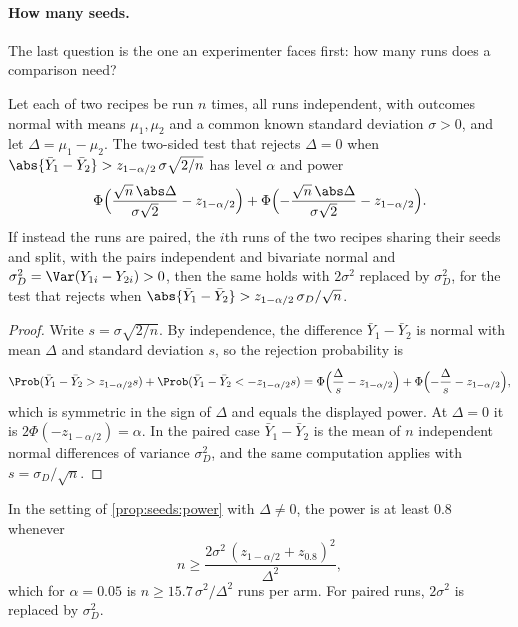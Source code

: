 \begin{refsection}
\paragraph{How many seeds.} The last question is the one an experimenter faces first: how many runs does a comparison need?

\begin{proposition}\label{prop:seeds:power}
Let each of two recipes be run $n$ times, all runs independent, with outcomes normal with means $\mu_1,\mu_2$ and a common known standard deviation $\sigma>0$, and let $\Delta=\mu_1-\mu_2$. The two-sided test that rejects $\Delta=0$ when $\abs{\bar Y_1-\bar Y_2}>z_{1-\alpha/2}\,\sigma\sqrt{2/n}$ has level $\alpha$ and power
\[
\Phi\Bigl(\frac{\sqrt n\,\abs\Delta}{\sigma\sqrt2}-z_{1-\alpha/2}\Bigr)+\Phi\Bigl(-\frac{\sqrt n\,\abs\Delta}{\sigma\sqrt2}-z_{1-\alpha/2}\Bigr).
\]
If instead the runs are paired, the $i$th runs of the two recipes sharing their seeds and split, with the pairs independent and bivariate normal and $\sigma_D^2=\Var(Y_{1i}-Y_{2i})>0$, then the same holds with $2\sigma^2$ replaced by $\sigma_D^2$, for the test that rejects when $\abs{\bar Y_1-\bar Y_2}>z_{1-\alpha/2}\,\sigma_D/\sqrt n$.
\end{proposition}

\begin{proof}
Write $s=\sigma\sqrt{2/n}$. By independence, the difference $\bar Y_1-\bar Y_2$ is normal with mean $\Delta$ and standard deviation $s$, so the rejection probability is
\[
\Prob(\bar Y_1-\bar Y_2>z_{1-\alpha/2}s)+\Prob(\bar Y_1-\bar Y_2<-z_{1-\alpha/2}s)=\Phi\Bigl(\frac\Delta s-z_{1-\alpha/2}\Bigr)+\Phi\Bigl(-\frac\Delta s-z_{1-\alpha/2}\Bigr),
\]
which is symmetric in the sign of $\Delta$ and equals the displayed power. At $\Delta=0$ it is $2\Phi(-z_{1-\alpha/2})=\alpha$. In the paired case $\bar Y_1-\bar Y_2$ is the mean of $n$ independent normal differences of variance $\sigma_D^2$, and the same computation applies with $s=\sigma_D/\sqrt n$.
\end{proof}

\begin{corollary}\label{cor:seeds:nseeds}
In the setting of \cref{prop:seeds:power} with $\Delta\ne0$, the power is at least $0.8$ whenever
\[
n\ge\frac{2\sigma^2\,(z_{1-\alpha/2}+z_{0.8})^2}{\Delta^2},
\]
which for $\alpha=0.05$ is $n\ge15.7\,\sigma^2/\Delta^2$ runs per arm. For paired runs, $2\sigma^2$ is replaced by $\sigma_D^2$.
\end{corollary}


\end{refsection}

